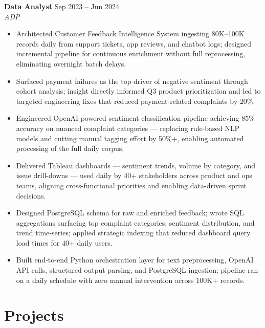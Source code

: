 \documentclass[10pt,letterpaper]{article}
\newcommand{\entry}[3]{%
  \vspace{3pt}\textbf{#1} \hfill #3 \\
  \textit{\small #2}\vspace{1pt}}
\begin{document}
\entry{Data Analyst}{ADP}{Sep 2023 -- Jun 2024}
\begin{itemize}
  \item Architected Customer Feedback Intelligence System ingesting 80K--100K records daily from support tickets, app reviews, and chatbot logs; designed incremental pipeline for continuous enrichment without full reprocessing, eliminating overnight batch delays.
  \item Surfaced payment failures as the top driver of negative sentiment through cohort analysis; insight directly informed Q3 product prioritization and led to targeted engineering fixes that reduced payment-related complaints by 20\%.
  \item Engineered OpenAI-powered sentiment classification pipeline achieving 85\% accuracy on nuanced complaint categories --- replacing rule-based NLP models and cutting manual tagging effort by 50\%+, enabling automated processing of the full daily corpus.
  \item Delivered Tableau dashboards --- sentiment trends, volume by category, and issue drill-downs --- used daily by 40+ stakeholders across product and ops teams, aligning cross-functional priorities and enabling data-driven sprint decisions.
  \item Designed PostgreSQL schema for raw and enriched feedback; wrote SQL aggregations surfacing top complaint categories, sentiment distribution, and trend time-series; applied strategic indexing that reduced dashboard query load times for 40+ daily users.
  \item Built end-to-end Python orchestration layer for text preprocessing, OpenAI API calls, structured output parsing, and PostgreSQL ingestion; pipeline ran on a daily schedule with zero manual intervention across 100K+ records.
\end{itemize}

\section{Projects}
\end{document}
